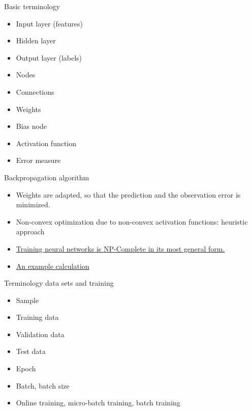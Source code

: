 \documentclass[color=usenames,dvipsnames]{beamer}
\begin{document}
\begin{frame}{Basic terminology} 

\begin{itemize}
\item Input layer (features)
\item Hidden layer
\item Output layer (labels)
\item Nodes
\item Connections
\item Weights
\item Bias node
\item Activation function
\item Error measure
\end{itemize}

\end{frame}





\begin{frame}{Backpropagation algorithm} 

\begin{itemize}
\item Weights are adapted, so that the prediction and the observation error is minimized.\\
\item Non-convex optimization due to non-convex activation functions: heuristic approach\\
\item \href{https://page.mi.fu-berlin.de/rojas/neural/chapter/K10.pdf}{{Training neural networks is NP-Complete in its most general form.}}\\
\item \href{https://mattmazur.com/2015/03/17/a-step-by-step-backpropagation-example/}{An example calculation}

\end{itemize}

\end{frame}

\begin{frame}{Terminology data sets and training} 

\begin{itemize}
\item Sample
\item Training data
\item Validation data 
\item Test data
\item Epoch
\item Batch, batch size
\item Online training, micro-batch training, batch training
\end{itemize}

\end{frame}
\end{document}
